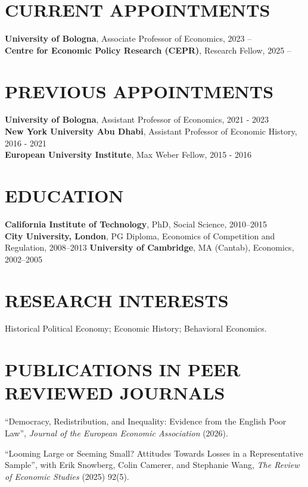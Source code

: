 \documentclass{res}  %
\begin{document}
\begin{resume} 
\vspace{10mm}

\doublespacing
\section{CURRENT APPOINTMENTS}
	\textbf{University of Bologna}, Associate Professor of Economics, 2023 -- \\
	\textbf{Centre for Economic Policy Research (CEPR)}, Research Fellow, 2025 -- 

\section{PREVIOUS APPOINTMENTS}
	\textbf{University of Bologna}, Assistant Professor of Economics, 2021 - 2023 \\
	\textbf{New York University Abu Dhabi}, Assistant Professor of Economic History, 2016 - 2021 \\
	\textbf{European University Institute}, Max Weber Fellow, 2015 - 2016

\section{EDUCATION} 
\textbf{California Institute of Technology}, PhD, Social Science, 2010--2015 \\
\textbf{City University, London}, PG Diploma, Economics of Competition and Regulation, 2008--2013
\textbf{University of Cambridge}, MA (Cantab), Economics, 2002--2005

\section{RESEARCH INTERESTS}
Historical Political Economy; Economic History; Behavioral Economics.

\section{PUBLICATIONS IN PEER REVIEWED JOURNALS}
``Democracy, Redistribution, and Inequality: Evidence from the English Poor Law'', \textit{Journal of the European Economic Association} (2026).

``Looming Large or Seeming Small? Attitudes Towards Losses in a Representative Sample'', with Erik Snowberg, Colin Camerer, and Stephanie Wang, \textit{The Review of Economic Studies} (2025) 92(5).


\end{resume}
\end{document}

